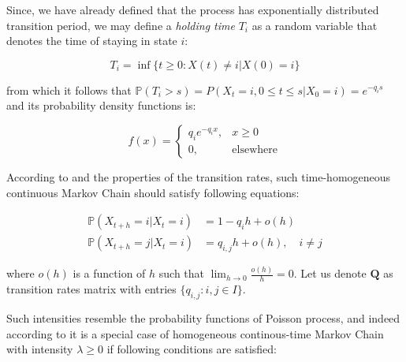 Since, we have already defined that the process has exponentially distributed transition period, we may define a \textit{holding time} $T_i$ as a random variable that denotes the time of staying in state $i$:

\begin{equation}
T_i = \inf \{t \geq 0 : X(t) \neq i | X(0) = i\}
\end{equation}

from which it follows that $\mathbb{P}(T_i>s) = P(X_t=i,0 \leq t \leq s|X_0=i) = e^{-q_i s}$ and its probability density functions is:

\begin{equation}
    f(x) = 
    \begin{cases}
        q_i e^{-q_i x}, & x \geq 0\\
        0, & \text{elsewhere}
    \end{cases}
\end{equation}

According to \cite{Praskova2012} and the properties of the transition rates, such time-homogeneous continuous Markov Chain should satisfy following equations:

\begin{equation}
    \begin{aligned}
        \mathbb{P}(X_{t+h}=i|X_t=i) &= 1 - q_i h + o(h) \\
        \mathbb{P}(X_{t+h}=j|X_t=i) &= q_{i,j} h + o(h), \quad i \neq j
    \end{aligned}
\end{equation}

where $o(h)$ is a function of $h$ such that $\lim_{h \to 0} \frac{o(h)}{h} = 0$. Let us denote $\textbf{Q}$ as transition rates matrix with entries $\{q_{i,j}: i,j \in I\}$.

Such intensities resemble the probability functions of Poisson process, and indeed according to \cite{Norris2012} it is a special case of homogeneous continous-time Markov Chain with intensity $\lambda \geq 0$ if following conditions are satisfied:

